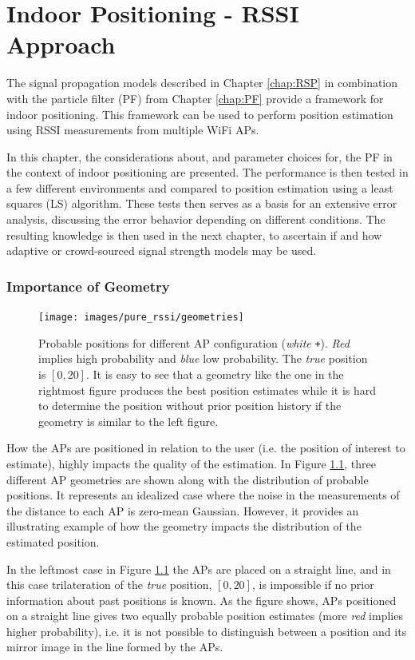 \documentclass{LTHthesis}
\begin{document}
\chapter{Indoor Positioning - RSSI Approach}
\label{chap:pure_rssi}
%
The signal propagation models described in Chapter \ref{chap:RSP} in combination with the particle filter (PF) from Chapter \ref{chap:PF} provide a framework for indoor positioning. This framework can be used to perform position estimation using RSSI measurements from multiple WiFi APs. 

In this chapter, the considerations about, and parameter choices for, the PF in the context of indoor positioning are presented. The performance is then tested in a few different environments and compared to position estimation using a least squares (LS) algorithm.  These tests then serves as a basis for an extensive error analysis, discussing the error behavior depending on different conditions. The resulting knowledge is then used in the next chapter, to ascertain if and how adaptive or crowd-sourced signal strength models may be used.
%
\subsection{Importance of Geometry}
%
\begin{figure}[!hbt]

\texttt{[image: images/pure\_rssi/geometries]}
\caption{Probable positions for different AP configuration (\emph{white} \texttt{+}). \emph{Red} implies high probability and \emph{blue} low probability. The \emph{true} position is $[0, 20]$. It is easy to see that a geometry like the one in the rightmost figure produces the best position estimates while it is hard to determine the position without prior position history if the geometry is similar to the left figure. }\label{geometries}
\end{figure}
%
How the APs are positioned in relation to the user (i.e. the position of interest to estimate), highly impacts the quality of the estimation. In Figure \ref{geometries}, three different AP geometries are shown along with the distribution of probable positions. It represents an idealized case where the noise in the measurements of the distance to each AP is zero-mean Gaussian. However, it provides an illustrating example of how the geometry impacts the distribution of the estimated position.

In the leftmost case in Figure \ref{geometries} the APs are placed on a straight line, and in this case trilateration of the \emph{true} position, $[0,20]$, is impossible if no prior information about past positions is known. As the figure shows, APs positioned on a straight line gives two equally probable position estimates (more \emph{red} implies higher probability), i.e. it is not possible to distinguish between a position and its mirror image in the line formed by the APs. 
\end{document}
